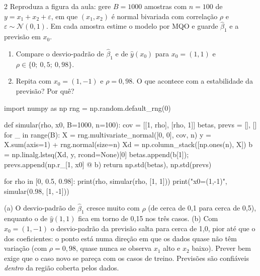 \documentclass[lista]{tmlnotas}
\begin{document}
\begin{exercicio}{2}
Reproduza a figura da aula: gere $B=1000$ amostras com $n=100$ de
$y = x_1 + x_2 + \varepsilon$, em que $(x_1, x_2)$ é normal bivariada com
correlação $\rho$ e $\varepsilon\sim\mathcal{N}(0,1)$. Em cada amostra estime o
modelo por MQO e guarde $\hat\beta_1$ e a previsão em $x_0$.
\begin{enumerate}[label=(\alph*)]
  \item Compare o desvio-padrão de $\hat\beta_1$ e de $\hat y(x_0)$ para
        $x_0=(1,1)$ e $\rho \in \{0;\ 0{,}5;\ 0{,}98\}$.
  \item Repita com $x_0 = (1,-1)$ e $\rho = 0{,}98$. O que acontece com a
        estabilidade da previsão? Por quê?
\end{enumerate}
\end{exercicio}
\begin{solucao}
\begin{codigo}
import numpy as np
rng = np.random.default_rng(0)

def simular(rho, x0, B=1000, n=100):
    cov = [[1, rho], [rho, 1]]
    betas, prevs = [], []
    for _ in range(B):
        X = rng.multivariate_normal([0, 0], cov, n)
        y = X.sum(axis=1) + rng.normal(size=n)
        Xd = np.column_stack([np.ones(n), X])
        b = np.linalg.lstsq(Xd, y, rcond=None)[0]
        betas.append(b[1]); prevs.append(np.r_[1, x0] @ b)
    return np.std(betas), np.std(prevs)

for rho in [0, 0.5, 0.98]:
    print(rho, simular(rho, [1, 1]))
print("x0=(1,-1)", simular(0.98, [1, -1]))
\end{codigo}
(a) O desvio-padrão de $\hat\beta_1$ cresce muito com $\rho$ (de cerca de 0,1
para cerca de 0,5), enquanto o de $\hat y(1,1)$ fica em torno de 0,15 nos três
casos. (b) Com $x_0=(1,-1)$ o desvio-padrão da previsão salta para cerca de 1,0,
pior até que o dos coeficientes: o ponto está
numa direção em que os dados quase não têm variação (com $\rho=0{,}98$, quase
nunca se observa $x_1$ alto e $x_2$ baixo). Prever bem exige que o caso novo
se pareça com os casos de treino. Previsões são confiáveis \emph{dentro} da
região coberta pelos dados.
\end{solucao}
\end{document}
